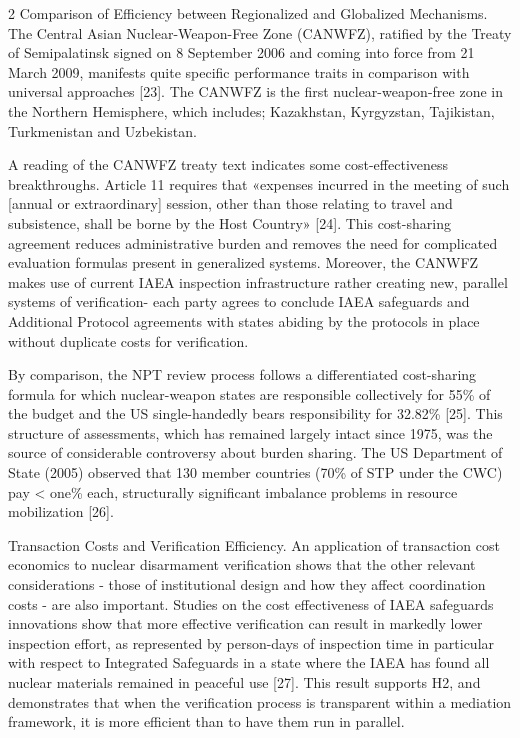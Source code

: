\begin{multicols}{2}
Comparison of Efficiency between Regionalized and Globalized Mechanisms.
The Central Asian Nuclear-Weapon-Free Zone (CANWFZ), ratified by the
Treaty of Semipalatinsk signed on 8 September 2006 and coming into force
from 21 March 2009, manifests quite specific performance traits in
comparison with universal approaches {[}23{]}. The CANWFZ is the first
nuclear-weapon-free zone in the Northern Hemisphere, which includes;
Kazakhstan, Kyrgyzstan, Tajikistan, Turkmenistan and Uzbekistan.

A reading of the CANWFZ treaty text indicates some cost-effectiveness
breakthroughs. Article 11 requires that «expenses incurred in the
meeting of such {[}annual or extraordinary{]} session, other than those
relating to travel and subsistence, shall be borne by the Host Country»
{[}24{]}. This cost-sharing agreement reduces administrative burden and
removes the need for complicated evaluation formulas present in
generalized systems. Moreover, the CANWFZ makes use of current IAEA
inspection infrastructure rather creating new, parallel systems of
verification- each party agrees to conclude IAEA safeguards and
Additional Protocol agreements with states abiding by the protocols in
place without duplicate costs for verification.

By comparison, the NPT review process follows a differentiated
cost-sharing formula for which nuclear-weapon states are responsible
collectively for 55\% of the budget and the US single-handedly bears
responsibility for 32.82\% {[}25{]}. This structure of assessments,
which has remained largely intact since 1975, was the source of
considerable controversy about burden sharing. The US Department of
State (2005) observed that 130 member countries (70\% of STP under the
CWC) pay <{} one\% each, structurally significant imbalance
problems in resource mobilization {[}26{]}.

Transaction Costs and Verification Efficiency. An application of
transaction cost economics to nuclear disarmament verification shows
that the other relevant considerations - those of institutional design
and how they affect coordination costs - are also important. Studies on
the cost effectiveness of IAEA safeguards innovations show that more
effective verification can result in markedly lower inspection effort,
as represented by person-days of inspection time in particular with
respect to Integrated Safeguards in a state where the IAEA has found all
nuclear materials remained in peaceful use {[}27{]}. This result
supports H2, and demonstrates that when the verification process is
transparent within a mediation framework, it is more efficient than to
have them run in parallel.


\end{multicols}
